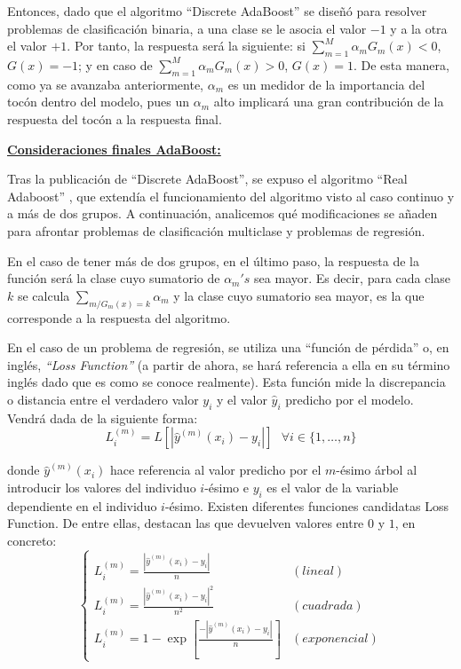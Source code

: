 \documentclass[12pt,twoside]{article}
\begin{document}
Entonces, dado que el algoritmo ``Discrete AdaBoost'' se diseñó para resolver problemas de clasificación binaria, a una clase se le asocia el valor $-1$ y a la otra el valor $+1$. Por tanto, la respuesta será la siguiente: si $\sum_{m=1}^M \alpha_m G_m(x) < 0$, $G(x) = - 1$; y en caso de $\sum_{m=1}^M \alpha_m G_m(x) > 0$, $G(x) = 1$. De esta manera, como ya se avanzaba anteriormente, $\alpha_m$ es un medidor de la importancia del tocón dentro del modelo, pues un $\alpha_m$ alto implicará una gran contribución de la respuesta del tocón a la respuesta final.

\bigskip

\textbf{\underline{Consideraciones finales AdaBoost:}}

Tras la publicación de ``Discrete AdaBoost'', se expuso el algoritmo ``Real Adaboost'' \cite{FR02}, que extendía el funcionamiento del algoritmo visto al caso continuo y a más de dos grupos. A continuación, analicemos qué modificaciones se añaden para afrontar problemas de clasificación multiclase y problemas de regresión.

En el caso de tener más de dos grupos, en el último paso, la respuesta de la función será la clase cuyo sumatorio de $\alpha_m's$ sea mayor. Es decir, para cada clase $k$ se calcula $\sum_{m / G_m(x) = k} \alpha_m$ y la clase cuyo sumatorio sea mayor, es la que corresponde a la respuesta del algoritmo.

En el caso de un problema de regresión, se utiliza una ``función de pérdida'' o, en inglés, \textit{``Loss Function''} (a partir de ahora, se hará referencia a ella en su término inglés dado que es como se conoce realmente). Esta función mide la discrepancia o distancia entre el verdadero valor $y_i$ y el valor $\hat{y}_i$ predicho por el modelo. Vendrá dada de la siguiente forma:
\begin{equation*}
L_i^{(m)} = L \left[ |\hat{y}^{(m)}(x_i) - y_i| \right] \, \, \, \, \forall i \in \{ 1, \dots, n \}
\end{equation*}

\noindent
donde $\hat{y}^{(m)}(x_i)$ hace referencia al valor predicho por el $m$-ésimo árbol al introducir los valores del individuo $i$-ésimo e $y_i$ es el valor de la variable dependiente en el individuo $i$-ésimo. Existen diferentes funciones candidatas Loss Function. De entre ellas, destacan las que devuelven valores entre $0$ y $1$, en concreto:
\begin{equation*}
\left\{
\begin{array}{cl}
L_i^{(m)} = \frac{|\hat{y}^{(m)}(x_i) - y_i|}{n} &  (lineal) \\ 
L_i^{(m)} = \frac{|\hat{y}^{(m)}(x_i) - y_i|^2}{n^2} & (cuadrada) \\
L_i^{(m)} = 1 - \exp \left[ \frac{-|\hat{y}^{(m)}(x_i) - y_i|}{n} \right] & (exponencial)
\end{array}
\right.
\end{equation*}
\end{document}
